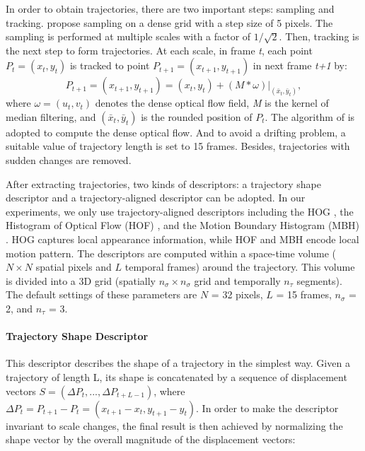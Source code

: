 \documentclass[review]{elsarticle}
\begin{document}
In order to obtain trajectories, there are two important steps: sampling and tracking. \cite{wang2011densetraj} propose sampling on a dense grid with a step size of 5 pixels. The sampling is performed at multiple scales with a factor of $1/\sqrt{2}$. Then, tracking is the next step to form trajectories. At each scale, in frame \textit{t}, each point \textit{$P_t = (x_t, y_t)$} is tracked to point \textit{$P_{t+1} = (x_{t+1}, y_{t+1})$} in next frame \textit{t+1} by:
\begin{equation}
	\textit{$P_{t+1} = (x_{t+1}, y_{t+1}) = (x_t, y_t) + (M*\omega)|_{(\bar{x}_t,\bar{y}_t)} $},
\end{equation}
where \textit{$\omega = (u_t, v_t)$} denotes the dense optical flow field, \textit{M} is the kernel of median filtering, and \textit{$(\bar{x}_t,\bar{y}_t)$} is the rounded position of \textit{$P_t$}. The algorithm of \cite{farneback2003two} is adopted to compute the dense optical flow. And to avoid a drifting problem, a suitable value of trajectory length is set to 15 frames. Besides, trajectories with sudden changes are removed.

After extracting trajectories, two kinds of descriptors: a trajectory shape descriptor and a trajectory-aligned descriptor can be adopted. In our experiments, we only use trajectory-aligned descriptors including the HOG \cite{dalal2005histograms}, the Histogram of Optical Flow (HOF) \cite{laptev2008learning}, and the Motion Boundary Histogram (MBH) \cite{dalal2006human}. HOG captures local appearance information, while HOF and MBH encode local motion pattern. The descriptors are computed within a space-time volume ($N \times N$ spatial pixels and $L$ temporal frames) around the trajectory. This volume is divided into a 3D grid (spatially $n_\sigma \times n_\sigma$ grid and temporally $n_\tau$ segments). The default settings of these parameters are $N$ = 32 pixels, $L$ = 15 frames, $n_\sigma$ = 2, and $n_\tau$ = 3.

\iffalse
\paragraph{Trajectory Shape Descriptor}This descriptor describes the shape of a trajectory in the simplest way. Given a trajectory of length L, its shape is concatenated by a sequence of displacement vectors \textit{$S = (\Delta P_t, ..., \Delta P_{t+L-1})$}, where \textit{$\Delta P_t = P_{t+1} - P_t = (x_{t+1} - x_t, y_{t+1} - y_t)$}. In order to make the descriptor invariant to scale changes, the final result is then achieved by normalizing the shape vector by the overall magnitude of the displacement vectors:
\end{document}
